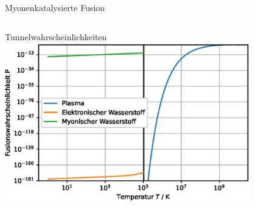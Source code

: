 \begin{frame}{Myonenkatalysierte Fusion}
\begin{columns}
\begin{column}{0.45\textwidth}
\begin{center}
            \end{center}
        \end{column}
    \end{columns}
\end{frame}

\begin{frame}{Tunnelwahrscheinlichkeiten}
    \centering
    \includegraphics[width=0.8\textwidth]{images/Tunnelwahrscheinlichkeiten.eps}
\end{frame}

